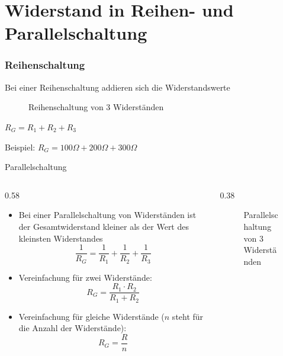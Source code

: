 
\section{Widerstand in Reihen- und Parallelschaltung}
\label{section:reihe_parallel_widerstand}
\begin{frame}%

\frametitle{Reihenschaltung}
Bei einer Reihenschaltung addieren sich die Widerstandswerte


\begin{figure}
    \caption{\scriptsize Reihenschaltung von 3 Widerständen}
    \label{e_reihenschaltung_von_r}
\end{figure}

$R_{ G } = R_{ 1 } + R_{ 2 } + R_{ 3 }$

Beispiel: $R_{ G } = 100 \Omega + 200 \Omega + 300 \Omega$

\end{frame}

\begin{frame}{Parallelschaltung}
    
    \begin{columns}
        \begin{column}{0.58\linewidth}
            \begin{itemize}
                \item Bei einer Parallelschaltung von Widerständen ist der Gesamtwiderstand kleiner als der Wert des kleinsten Widerstandes
                $$\frac{ 1 }{ R_{ G } } = \frac{ 1 }{ R_{ 1 } } + \frac{ 1 }{ R_{ 2 } } + \frac{ 1 }{ R_{ 3 } }$$
                \item Vereinfachung für zwei Widerstände:
                $$R_{ G } = \dfrac{ R_{ 1 } \cdot R_{ 2 } }{ R_{ 1 } + R_{ 2 }}$$
                \item Vereinfachung für gleiche Widerstände ($n$ steht für die Anzahl der Widerstände): $$R_{ G } = \dfrac{ R }{ n }$$
            \end{itemize}
        \end{column}
        \begin{column}{0.38\linewidth}
            \begin{figure}
                \caption{\scriptsize Parallelschaltung von 3 Widerständen}
                \label{e_parallelschaltung_von_r}
            \end{figure}
        \end{column}
    \end{columns}
\end{frame}


